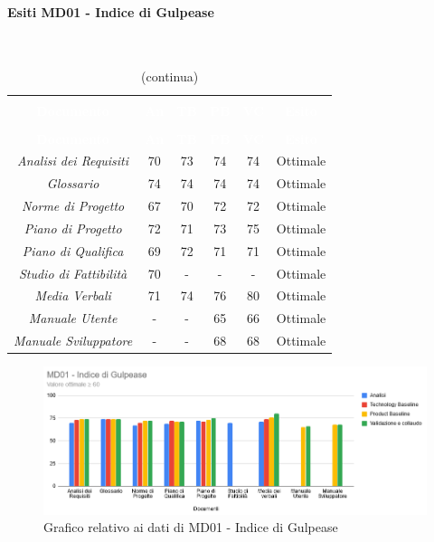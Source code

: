 \paragraph{Esiti MD01 - Indice di Gulpease} \mbox{} \\
\begin{longtable}{c c c c c c}
\rowcolor{white}\caption{Esiti MD01 - Indice di Gulpease} \\
		\rowcolor{redafk}
\textcolor{white}{\textbf{Documento}} &
\textcolor{white}{\textbf{An}} &
\textcolor{white}{\textbf{TB}} &
\textcolor{white}{\textbf{PB}} &
\textcolor{white}{\textbf{VC}} &
\textcolor{white}{\textbf{Esito}} \\
		\endfirsthead
		\rowcolor{white}\caption[]{(continua)} \\
		\rowcolor{redafk}
\textcolor{white}{\textbf{Documento}} &
\textcolor{white}{\textbf{An}} &
\textcolor{white}{\textbf{TB}} &
\textcolor{white}{\textbf{PB}} &
\textcolor{white}{\textbf{VC}} &
\textcolor{white}{\textbf{Esito}} \\
		\endhead
		\textit{Analisi dei Requisiti} & 70 & 73 & 74 & 74 & Ottimale \\
		\textit{Glossario} & 74 & 74 & 74 & 74 & Ottimale \\
		\textit{Norme di Progetto} & 67 & 70 & 72 & 72 & Ottimale \\
		\textit{Piano di Progetto} & 72 & 71 & 73 & 75 & Ottimale \\
		\textit{Piano di Qualifica} & 69 & 72 & 71 & 71 & Ottimale \\
		\textit{Studio di Fattibilità} & 70 & - & - & - & Ottimale \\
		\textit{Media Verbali} & 71 & 74 & 76 & 80 & Ottimale\\
		\textit{Manuale Utente} & - & - & 65 & 66 & Ottimale \\
		\textit{Manuale Sviluppatore} & - & - & 68 & 68 & Ottimale \\
\end{longtable}

\begin{figure}[H]
\centering
\includegraphics[scale=0.7]{./img/MD01_gulpease.png}
\caption{Grafico relativo ai dati di MD01 - Indice di Gulpease}
\end{figure}

